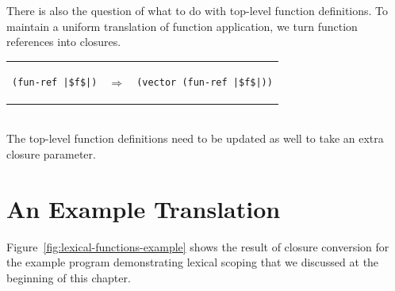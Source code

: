 \documentclass[11pt]{book}
\begin{document}
There is also the question of what to do with top-level function
definitions. To maintain a uniform translation of function
application, we turn function references into closures.

\begin{tabular}{lll}
\begin{minipage}{0.3\textwidth}
\begin{lstlisting}
(fun-ref |$f$|)
\end{lstlisting}
\end{minipage}
&
$\Rightarrow$
&
\begin{minipage}{0.5\textwidth}
\begin{lstlisting}
(vector (fun-ref |$f$|))
\end{lstlisting}
\end{minipage}
\end{tabular}  \\
%
The top-level function definitions need to be updated as well to take
an extra closure parameter.

\section{An Example Translation}
\label{sec:example-lambda}

Figure~\ref{fig:lexical-functions-example} shows the result of closure
conversion for the example program demonstrating lexical scoping that
we discussed at the beginning of this chapter.
\end{document}
